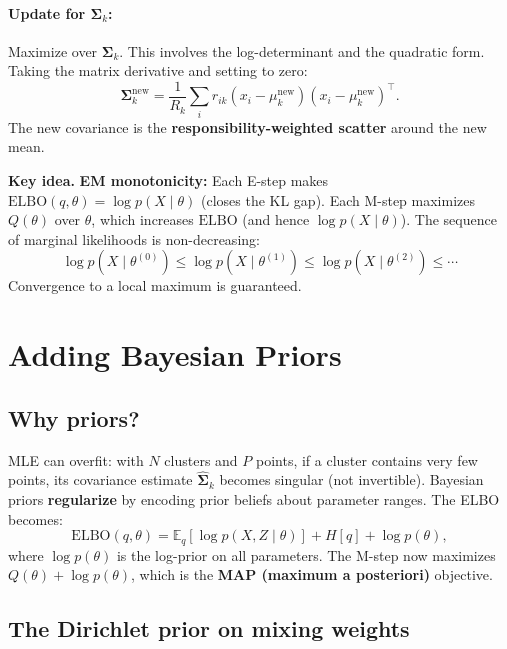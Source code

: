 \documentclass[11pt]{article}
\theoremstyle{definition}
\theoremstyle{plain}
\theoremstyle{remark}
\newcommand{\E}{\mathbb{E}}
\newcommand{\Sv}{\boldsymbol{\Sigma}}
\newenvironment{keyidea}{\par\medskip\noindent\textbf{Key idea.} }{\par\medskip}
\begin{document}
\paragraph{Update for $\Sv_k$:} Maximize over $\Sv_k$. This involves the log-determinant and the quadratic form. Taking the matrix derivative and setting to zero:
\begin{equation}
  \Sv_k^{\mathrm{new}} = \frac{1}{R_k}\sum_i r_{ik}(x_i-\mu_k^{\mathrm{new}})(x_i-\mu_k^{\mathrm{new}})^\top.
\end{equation}
The new covariance is the \textbf{responsibility-weighted scatter} around the new mean.

\begin{keyidea}
\textbf{EM monotonicity:} Each E-step makes $\mathrm{ELBO}(q,\theta)=\log p(X\mid\theta)$ (closes the KL gap). Each M-step maximizes $Q(\theta)$ over $\theta$, which increases $\mathrm{ELBO}$ (and hence $\log p(X\mid\theta)$). The sequence of marginal likelihoods is non-decreasing:
\[
  \log p(X\mid\theta^{(0)}) \leq \log p(X\mid\theta^{(1)}) \leq \log p(X\mid\theta^{(2)}) \leq \cdots
\]
Convergence to a local maximum is guaranteed.
\end{keyidea}

\section{Adding Bayesian Priors}

\subsection{Why priors?}

MLE can overfit: with $N$ clusters and $P$ points, if a cluster contains very few points, its covariance estimate $\hat{\Sv}_k$ becomes singular (not invertible). Bayesian priors \textbf{regularize} by encoding prior beliefs about parameter ranges. The ELBO becomes:
\begin{equation}
  \mathrm{ELBO}(q,\theta) = \E_q[\log p(X,Z\mid\theta)] + H[q] + \log p(\theta),
\end{equation}
where $\log p(\theta)$ is the log-prior on all parameters. The M-step now maximizes $Q(\theta)+\log p(\theta)$, which is the \textbf{MAP (maximum a posteriori)} objective.

\subsection{The Dirichlet prior on mixing weights}
\end{document}
